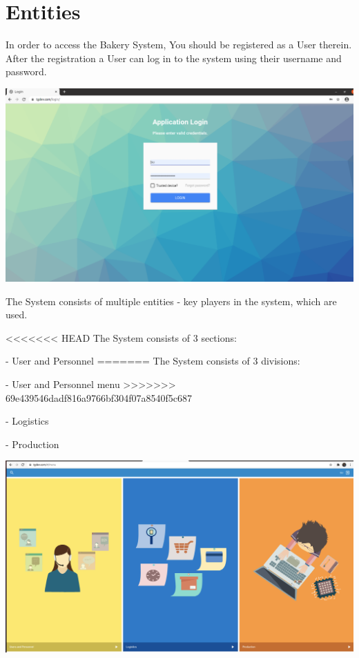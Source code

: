 \section{Entities}\label{sec:01}
In order to access the Bakery System, You should be registered as a User therein. 
After the registration a User can log in to the system using their username and password.

\includegraphics[width=\textwidth]{sections/01-chapter/images/login.png}

The System consists of multiple entities - key players in the system, which are used.

<<<<<<< HEAD
The System consists of 3 sections:

- User and Personnel 
=======
The System consists of 3 divisions:

- User and Personnel menu
>>>>>>> 69e439546dadf816a9766bf304f07a8540f5c687

- Logistics

- Production

\includegraphics[width=\textwidth]{sections/01-chapter/images/main.png}


